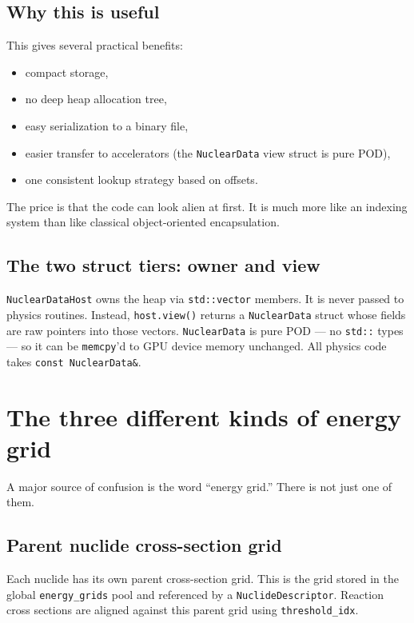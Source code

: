 \documentclass[11pt,a4paper]{article}
\begin{document}
\subsection{Why this is useful}
This gives several practical benefits:
\begin{itemize}[leftmargin=1.4em]
  \item compact storage,
  \item no deep heap allocation tree,
  \item easy serialization to a binary file,
  \item easier transfer to accelerators (the \texttt{NuclearData} view struct is pure POD),
  \item one consistent lookup strategy based on offsets.
\end{itemize}
The price is that the code can look alien at first. It is much more like an indexing system than like classical object-oriented encapsulation.

\subsection{The two struct tiers: owner and view}
\texttt{NuclearDataHost} owns the heap via \texttt{std::vector} members. It is never passed to physics routines. Instead, \texttt{host.view()} returns a \texttt{NuclearData} struct whose fields are raw pointers into those vectors. \texttt{NuclearData} is pure POD --- no \texttt{std::} types --- so it can be \texttt{memcpy}'d to GPU device memory unchanged. All physics code takes \texttt{const NuclearData\&}.

\section{The three different kinds of energy grid}
A major source of confusion is the word ``energy grid.'' There is not just one of them.

\subsection{Parent nuclide cross-section grid}
Each nuclide has its own parent cross-section grid. This is the grid stored in the global \texttt{energy\_grids} pool and referenced by a \texttt{NuclideDescriptor}. Reaction cross sections are aligned against this parent grid using \texttt{threshold\_idx}.
\end{document}
